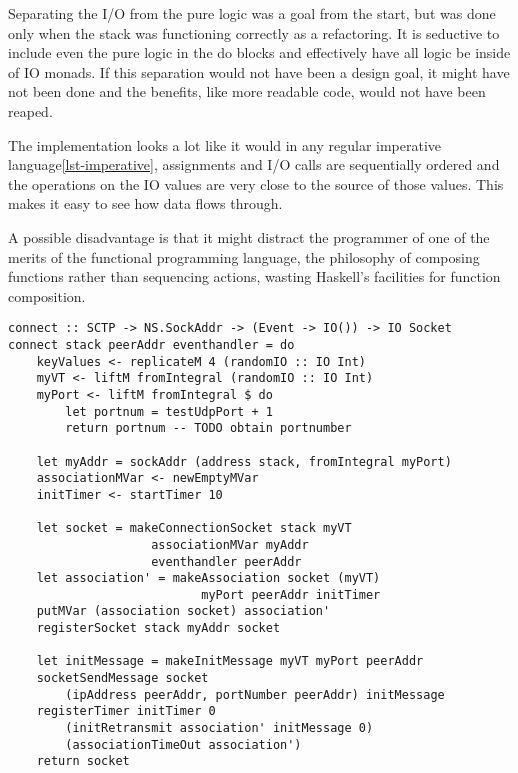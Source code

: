 
Separating the I/O from the pure logic was a goal from the start, but was done only when the stack was functioning correctly as a refactoring. It is seductive to include even the pure logic in the do blocks and effectively have all logic be inside of IO monads. If this separation would not have been a design goal, it might have not been done and the benefits, like more readable code, would not have been reaped.



The implementation looks a lot like it would in any regular imperative language\ref{lst-imperative}, assignments and I/O calls are sequentially ordered and the operations on the IO values are very close to the source of those values. This makes it easy to see how data flows through.

A possible disadvantage is that it might distract the programmer of one of the merits of the functional programming language, the philosophy of composing functions rather than sequencing actions, wasting Haskell's facilities for function composition. 

\begin{lstlisting}[caption={The connect function looks imperative}, label={lst-imperative}]
connect :: SCTP -> NS.SockAddr -> (Event -> IO()) -> IO Socket
connect stack peerAddr eventhandler = do
    keyValues <- replicateM 4 (randomIO :: IO Int)
    myVT <- liftM fromIntegral (randomIO :: IO Int)
    myPort <- liftM fromIntegral $ do 
        let portnum = testUdpPort + 1
        return portnum -- TODO obtain portnumber

    let myAddr = sockAddr (address stack, fromIntegral myPort)
    associationMVar <- newEmptyMVar
    initTimer <- startTimer 10

    let socket = makeConnectionSocket stack myVT
                    associationMVar myAddr
                    eventhandler peerAddr
    let association' = makeAssociation socket (myVT) 
                           myPort peerAddr initTimer
    putMVar (association socket) association'
    registerSocket stack myAddr socket

    let initMessage = makeInitMessage myVT myPort peerAddr
    socketSendMessage socket 
        (ipAddress peerAddr, portNumber peerAddr) initMessage
    registerTimer initTimer 0 
        (initRetransmit association' initMessage 0)
        (associationTimeOut association')
    return socket
\end{lstlisting}

